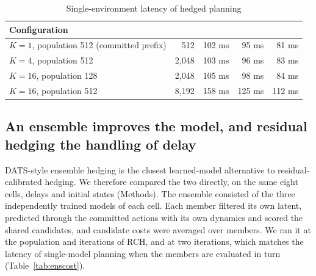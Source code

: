 \documentclass[aps,physrev,\manuscriptlayout,superscriptaddress,
  longbibliography,amsmath,amssymb]{revtex4-2}
\begin{document}
\begin{table}[t]
\centering
\caption{Single-environment latency of hedged planning}\label{tab:latency}
\begin{tabular*}{\textwidth}{@{\extracolsep\fill}lrrrr@{}}
\toprule
Configuration
& 
& 
& 
&  \\
\midrule
$K=1$, population 512 (committed prefix) & 512 & 102 ms & 95 ms & 81 ms \\
$K=4$, population 512 & 2{,}048 & 103 ms & 96 ms & 83 ms \\
$K=16$, population 128 & 2{,}048 & 105 ms & 98 ms & 84 ms \\
$K=16$, population 512 & 8{,}192 & 158 ms & 125 ms & 112 ms \\
\bottomrule
\end{tabular*}

\par{}
\end{table}

\subsection{An ensemble improves the model, and residual hedging the handling of delay}\label{sec:ensemble}

DATS-style ensemble hedging\cite{chen2020dats} is the closest learned-model alternative to residual-calibrated hedging. We therefore compared the two directly, on the same eight cells, delays and initial states (Methods). The ensemble consisted of the three independently trained models of each cell. Each member filtered its own latent, predicted through the committed actions with its own dynamics and scored the shared candidates, and candidate costs were averaged over members. We ran it at the population and iterations of RCH, and at two iterations, which matches the latency of single-model planning when the members are evaluated in turn (Table~\ref{tab:enscost}).
\end{document}
